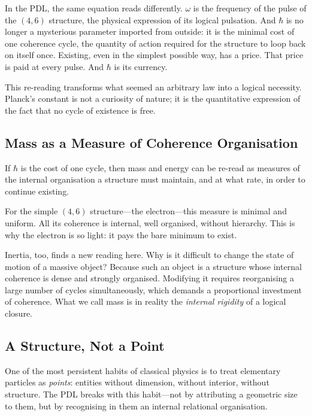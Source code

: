 \documentclass[12pt, a4paper, openright]{book}
\begin{document}
\medskip

In the PDL, the same equation reads differently. $\omega$ is the frequency of the pulse of the $(4,6)$ structure, the physical expression of its logical pulsation. And $\hbar$ is no longer a mysterious parameter imported from outside: it is the minimal cost of one coherence cycle, the quantity of action required for the structure to loop back on itself once. Existing, even in the simplest possible way, has a price. That price is paid at every pulse. And $\hbar$ is its currency.

\medskip

This re-reading transforms what seemed an arbitrary law into a logical necessity. Planck's constant is not a curiosity of nature; it is the quantitative expression of the fact that no cycle of existence is free.

\subsection*{Mass as a Measure of Coherence Organisation}

If $\hbar$ is the cost of one cycle, then mass and energy can be re-read as measures of the internal organisation a structure must maintain, and at what rate, in order to continue existing.

\medskip

For the simple $(4,6)$ structure---the electron---this measure is minimal and uniform. All its coherence is internal, well organised, without hierarchy. This is why the electron is so light: it pays the bare minimum to exist.

\medskip

Inertia, too, finds a new reading here. Why is it difficult to change the state of motion of a massive object? Because such an object is a structure whose internal coherence is dense and strongly organised. Modifying it requires reorganising a large number of cycles simultaneously, which demands a proportional investment of coherence. What we call mass is in reality the \emph{internal rigidity} of a logical closure.

\subsection*{A Structure, Not a Point}

One of the most persistent habits of classical physics is to treat elementary particles as \emph{points}: entities without dimension, without interior, without structure. The PDL breaks with this habit---not by attributing a geometric size to them, but by recognising in them an internal relational organisation.
\end{document}
